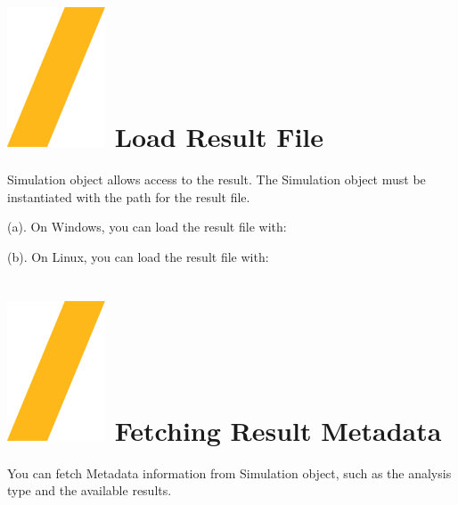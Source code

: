 \documentclass[9pt,landscape]{article}
\begin{document}
\begin{multicols}{3}
\setlength{\premulticols}{1pt}
\setlength{\postmulticols}{1pt}
\setlength{\multicolsep}{1pt}
\setlength{\columnsep}{2pt}

\vfill
\section{\includegraphics[height=\fontcharht\font`\S]{slash.png} Load Result File}

Simulation object allows access to the result. The Simulation object must be instantiated with the path for the result file.

\vspace{2mm} %

(a). On Windows, you can load the result file with:


(b). On Linux, you can load the result file with:


\section{\includegraphics[height=\fontcharht\font`\S]{slash.png} Fetching Result Metadata}

You can fetch Metadata information from Simulation object, such as the analysis type and the available results.


\end{multicols}
\end{document}
